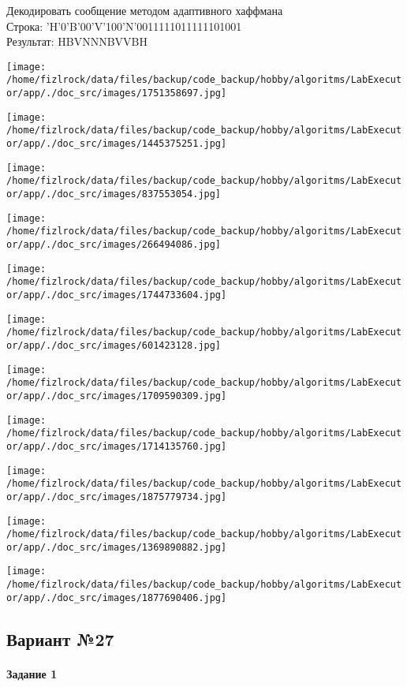 \documentclass[a4paper, 12pt]{article}
\begin{document}
Декодировать сообщение методом адаптивного хаффмана \\
Строка: 
'H'0'B'00'V'100'N'0011111011111101001\\
Результат: HBVNNNBVVBH

\texttt{[image: /home/fizlrock/data/files/backup/code\_backup/hobby/algoritms/LabExecutor/app/./doc\_src/images/1751358697.jpg]}

\texttt{[image: /home/fizlrock/data/files/backup/code\_backup/hobby/algoritms/LabExecutor/app/./doc\_src/images/1445375251.jpg]}

\texttt{[image: /home/fizlrock/data/files/backup/code\_backup/hobby/algoritms/LabExecutor/app/./doc\_src/images/837553054.jpg]}

\texttt{[image: /home/fizlrock/data/files/backup/code\_backup/hobby/algoritms/LabExecutor/app/./doc\_src/images/266494086.jpg]}

\texttt{[image: /home/fizlrock/data/files/backup/code\_backup/hobby/algoritms/LabExecutor/app/./doc\_src/images/1744733604.jpg]}

\texttt{[image: /home/fizlrock/data/files/backup/code\_backup/hobby/algoritms/LabExecutor/app/./doc\_src/images/601423128.jpg]}

\texttt{[image: /home/fizlrock/data/files/backup/code\_backup/hobby/algoritms/LabExecutor/app/./doc\_src/images/1709590309.jpg]}

\texttt{[image: /home/fizlrock/data/files/backup/code\_backup/hobby/algoritms/LabExecutor/app/./doc\_src/images/1714135760.jpg]}

\texttt{[image: /home/fizlrock/data/files/backup/code\_backup/hobby/algoritms/LabExecutor/app/./doc\_src/images/1875779734.jpg]}

\texttt{[image: /home/fizlrock/data/files/backup/code\_backup/hobby/algoritms/LabExecutor/app/./doc\_src/images/1369890882.jpg]}

\texttt{[image: /home/fizlrock/data/files/backup/code\_backup/hobby/algoritms/LabExecutor/app/./doc\_src/images/1877690406.jpg]}
\pagebreak
\subsection{Вариант №27}
\paragraph{Задание 1}
\end{document}
